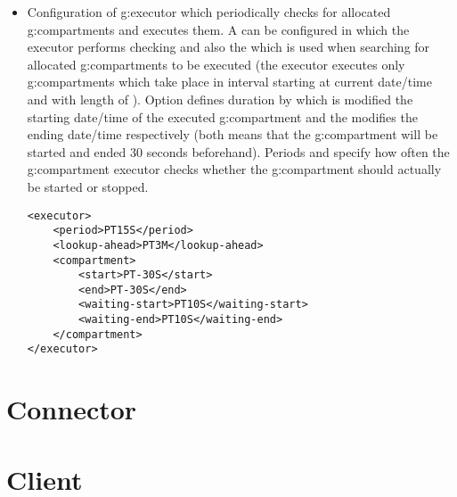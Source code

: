 \begin{itemize}
\item Configuration of \gls{g:executor} which periodically checks for allocated \glspl{g:compartment} and executes them. A  can be configured in which the executor performs checking and also the  which is used when searching for allocated \glspl{g:compartment} to be executed (the executor executes only \glspl{g:compartment} which take place in interval starting at current date/time and with length of ). Option  defines duration by which is modified the starting date/time of the executed \gls{g:compartment} and the  modifies the ending date/time respectively (both  means that the \gls{g:compartment} will be started and ended 30 seconds beforehand). Periods  and  specify how often the \gls{g:compartment} executor checks whether the \gls{g:compartment} should actually be started or stopped.
\begin{verbatim}
<executor>
    <period>PT15S</period>
    <lookup-ahead>PT3M</lookup-ahead>
    <compartment>
        <start>PT-30S</start>
        <end>PT-30S</end>
        <waiting-start>PT10S</waiting-start>
        <waiting-end>PT10S</waiting-end>
    </compartment>
</executor>
\end{verbatim}
\end{itemize}

\section{Connector}

\section{Client}

